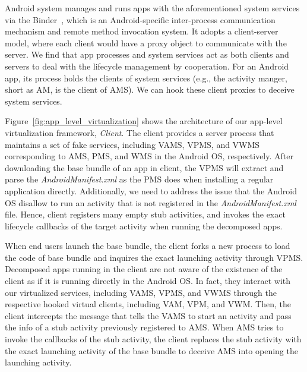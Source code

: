 Android system manages and runs apps with the aforementioned system services via the Binder~\cite{binder}, which is an Android-specific inter-process communication mechanism and remote method invocation system. 
It adopts a client-server model, where each client would have a proxy object to communicate with the server.  
We find that app processes and system services act as both clients and servers to deal with the lifecycle management by cooperation. 
For an Android app, its process holds the clients of system services (e.g., the activity manger, short as AM, is the client of AMS). We can hook these client proxies to deceive system services.

Figure~\ref{fig:app_level_virtualization} shows the architecture of our app-level virtualization framework, \emph{\nickName{} Client}. The \nickName{} client provides a server process that maintains a set of fake services, including VAMS, VPMS, and VWMS corresponding to AMS, PMS, and WMS in the Android OS, respectively. After downloading the base bundle of an app in \nickName{} client, the VPMS will extract and parse the \textit{AndroidManifest.xml} as the PMS does when installing a regular application directly. 
Additionally, we need to address the issue that the Android OS disallow to run an activity that is not registered in the \textit{AndroidManifest.xml} file. 
Hence, \nickName{} client registers many empty stub activities, and invokes the exact lifecycle callbacks of the target activity when running the decomposed apps. 

When end users launch the base bundle, the \nickName{} client forks a new process to load the code of base bundle and inquires the exact launching activity through VPMS. Decomposed apps running in the \nickName{} client are not aware of the existence of the \nickName{} client as if it is running directly in the Android OS. In fact, they interact with our virtualized services, including VAMS, VPMS, and VWMS through the respective hooked virtual clients, including VAM, VPM, and VWM. Then, the \nickName{} client intercepts the message that tells the VAMS to start an activity and pass the info of a stub activity previously registered to AMS. When AMS tries to invoke the callbacks of the stub activity, the \nickName client replaces the stub activity with the exact launching activity of the base bundle to deceive AMS into opening the launching activity. 


